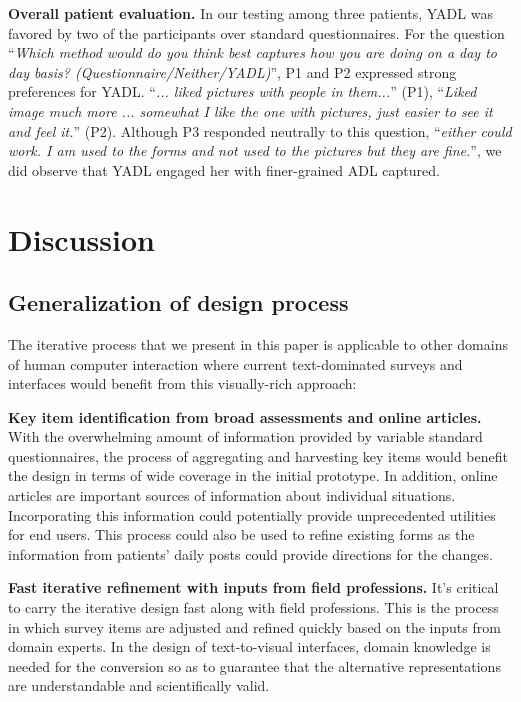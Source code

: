 \documentclass{sig-alternate-05-2015}
\begin{document}
\textbf{Overall patient evaluation.} In our testing among three patients, YADL was favored by two of the participants over standard questionnaires. For the question ``\textit{Which method would do you think best captures how you are doing on a day to day basis? (Questionnaire/Neither/YADL)}'', P1 and P2 expressed strong preferences for YADL. ``\textit{... liked pictures with people in them...}'' (P1), ``\textit{Liked image much more ... somewhat I like the one with pictures,  just easier to see it and feel it.}'' (P2). Although P3 responded neutrally to this question, ``\textit{either could work. I am used to the forms and not used to the pictures but they are fine.}'', we did observe that YADL engaged her with finer-grained ADL captured.
\vspace{-1mm}
\section{Discussion}

\subsection{Generalization of design process}

The iterative process that we present in this paper is applicable to other domains of human computer interaction where current text-dominated surveys and interfaces would benefit from this visually-rich approach:

\textbf{Key item identification from broad assessments and online articles.} With the overwhelming amount of information provided by variable standard questionnaires, the process of aggregating and harvesting key items would benefit the design in terms of wide coverage in the initial prototype. In addition, online articles are important sources of information about individual situations. Incorporating this information could potentially provide unprecedented utilities for end users. This process could also be used to refine existing forms as the information from patients' daily posts could provide directions for the changes.

\textbf{Fast iterative refinement with inputs from field professions.} It's critical to carry the iterative design fast along with field professions. This is the process in which survey items are adjusted and refined quickly based on the inputs from domain experts. In the design of text-to-visual interfaces, domain knowledge is needed for the conversion so as to guarantee that the alternative representations are understandable and scientifically valid.
\end{document}
